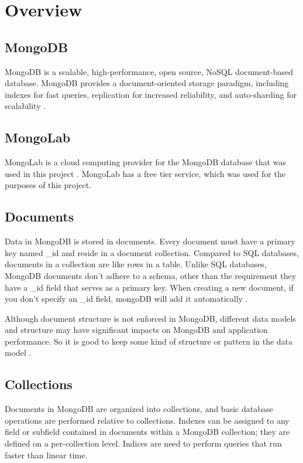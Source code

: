 \lstset{breaklines=true}

\section{Overview}
\subsection{MongoDB}
MongoDB is a scalable, high-performance, open source, NoSQL document-based database. MongoDB provides a document-oriented storage paradigm, including indexes for fast queries, replication for increased reliability, and auto-sharding for scalability \cite{mongodb}.

\subsection{MongoLab}
MongoLab is a cloud computing provider for the MongoDB database that was used in this project \cite{mongolab}.  MongoLab has a free tier service, which was used for the purposes of this project.

\subsection{Documents}
Data in MongoDB is stored in documents.  Every document must have a primary key named {\_id} and reside in a document collection. Compared to SQL databases, documents in a collection are like rows in a table.  Unlike SQL databases, MongoDB documents don't adhere to a schema, other than the requirement they have a {\_id} field that serves as a primary key.  When creating a new document, if you don't specify an {\_id} field, mongoDB will add it automatically \cite{mongodb}.

Although document structure is not enforced in MongoDB, different data models and structure may have significant impacts on MongoDB and application performance. So it is good to keep some kind of structure or pattern in the data model \cite{mongodb}.

\subsection{Collections}
Documents in MongoDB are organized into collections, and basic database operations are performed relative to collections. Indexes can be assigned to any field or subfield contained in documents within a MongoDB collection; they are defined on a per-collection level. Indices are need to perform queries that run faster than linear time.  \cite{mongodb}   

